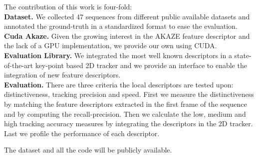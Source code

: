\documentclass[letterpaper, 10pt, conference]{ieeeconf}
\begin{document}
The contribution of this work is four-fold:\\
\textbf{Dataset.} We collected 47 sequences from different public available datasets and annotated the ground-truth in a standardized format to ease the evaluation.\\
\textbf{Cuda Akaze.} Given the growing interest in the AKAZE feature descriptor and the lack of a GPU implementation, we provide our own using CUDA.\\
\textbf{Evaluation Library.} We integrated the most well known descriptors in a state-of-the-art key-point based 2D tracker and we provide an interface to enable the integration of new feature descriptors.\\
\textbf{Evaluation.}  There are three criteria the local descriptors are tested upon: distinctiveness, tracking precision and speed. First we measure the distinctiveness by matching the feature descriptors extracted in the first frame of the sequence and by computing the recall-precision. Then we calculate the low, medium and high tracking accuracy measures by integrating the descriptors in the 2D tracker. Last we profile the performance of each descriptor.

The dataset and all the code will be publicly available.






%







\end{document}
